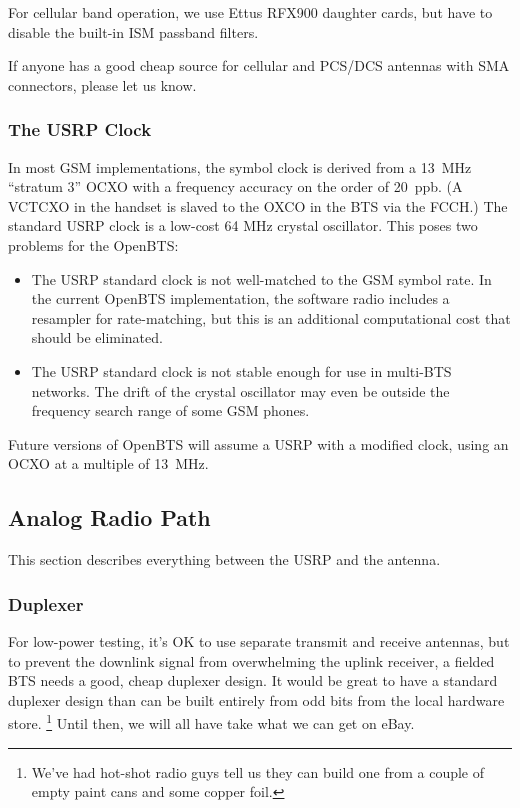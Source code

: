 \documentclass[11pt]{book}
\begin{document}
For cellular band operation, we use Ettus RFX900 daughter cards, but have to disable the built-in ISM passband filters.

If anyone has a good cheap source for cellular and PCS/DCS antennas with SMA connectors, please let us know.

\subsubsection{The USRP Clock}
In most GSM implementations, the symbol clock is derived from a 13~MHz ``stratum 3'' OCXO with a frequency accuracy on the order of 20~ppb.  (A VCTCXO in the handset is slaved to the OXCO in the BTS via the FCCH.)  The standard USRP clock is a low-cost 64 MHz crystal oscillator.  This poses two problems for the OpenBTS:
\begin{itemize}
	\item The USRP standard clock is not well-matched to the GSM symbol rate.  In the current OpenBTS implementation, the software radio includes a resampler for rate-matching, but this is an additional computational cost that should be eliminated.
	\item The USRP standard clock is not stable enough for use in multi-BTS networks.  The drift of the crystal oscillator may even be outside the frequency search range of some GSM phones.
\end{itemize}
Future versions of OpenBTS will assume a USRP with a modified clock, using an OCXO at a multiple of 13~MHz.



\subsection{Analog Radio Path}
This section describes everything between the USRP and the antenna.

\subsubsection{Duplexer}
For low-power testing, it's OK to use separate transmit and receive antennas, but to prevent the downlink signal from overwhelming the uplink receiver, a fielded BTS needs a good, cheap duplexer design.
It would be great to have a standard duplexer design than can be built entirely from odd bits from the local hardware store.%
\footnote{We've had hot-shot radio guys tell us they can build one from a couple of empty paint cans and some copper foil.}
Until then, we will all have take what we can get on eBay.
\end{document}
